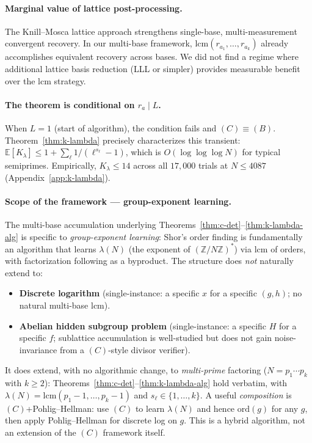 \documentclass[11pt]{article}
\begin{document}
\paragraph{Marginal value of lattice post-processing.}
The Knill--Mosca lattice approach strengthens single-base, multi-measurement convergent recovery. In our multi-base framework, $\mathrm{lcm}(r_{a_1}, \ldots, r_{a_k})$ already accomplishes equivalent recovery across bases. We did not find a regime where additional lattice basis reduction (LLL or simpler) provides measurable benefit over the lcm strategy.

\paragraph{The theorem is conditional on $r_a \mid L$.}
When $L = 1$ (start of algorithm), the condition fails and $(C) \equiv (B)$. Theorem~\ref{thm:k-lambda} precisely characterizes this transient: $\mathbb{E}[K_\lambda] \leq 1 + \sum_\ell 1/(\ell^{s_\ell} - 1)$, which is $O(\log \log \log N)$ for typical semiprimes. Empirically, $K_\lambda \leq 14$ across all $17{,}000$ trials at $N \leq 4087$ (Appendix~\ref{app:k-lambda}).

\paragraph{Scope of the framework --- group-exponent learning.}
The multi-base accumulation underlying Theorems~\ref{thm:c-det}--\ref{thm:k-lambda-alg} is specific to \emph{group-exponent learning}: Shor's order finding is fundamentally an algorithm that learns $\lambda(N)$ (the exponent of $(\mathbb{Z}/N\mathbb{Z})^*$) via $\mathrm{lcm}$ of orders, with factorization following as a byproduct. The structure does \emph{not} naturally extend to:
\begin{itemize}
  \item \textbf{Discrete logarithm} (single-instance: a specific $x$ for a specific $(g, h)$; no natural multi-base $\mathrm{lcm}$).
  \item \textbf{Abelian hidden subgroup problem} (single-instance: a specific $H$ for a specific $f$; sublattice accumulation is well-studied but does not gain noise-invariance from a $(C)$-style divisor verifier).
\end{itemize}
It does extend, with no algorithmic change, to \emph{multi-prime} factoring ($N = p_1 \cdots p_k$ with $k \geq 2$): Theorems~\ref{thm:c-det}--\ref{thm:k-lambda-alg} hold verbatim, with $\lambda(N) = \mathrm{lcm}(p_1 - 1, \ldots, p_k - 1)$ and $s_\ell \in \{1, \ldots, k\}$. A useful \emph{composition} is $(C)$+Pohlig--Hellman: use $(C)$ to learn $\lambda(N)$ and hence $\mathrm{ord}(g)$ for any $g$, then apply Pohlig--Hellman for discrete log on $g$. This is a hybrid algorithm, not an extension of the $(C)$ framework itself.
\end{document}
